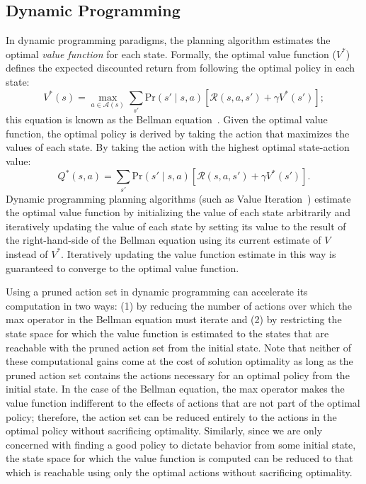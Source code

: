 \documentclass[]{article}
\newcommand{\stnote}[1]{\textcolor{Blue}{\textbf{ST: #1}}}
\newcommand{\dgnote}[1]{\textcolor{Orange}{\textbf{DG: #1}}}
\begin{document}
\subsection{Dynamic Programming}
In dynamic programming paradigms, the planning algorithm estimates the
optimal {\em value function} for each state. Formally, the optimal
value function ($V^*$) defines the expected discounted return from
following the optimal policy in each state:
\begin{equation}
\label{eq:bellman}
V^*(s) = \max_{a \in \mathcal{A}(s)} \sum_{s'} \text{Pr}(s' \mid s, a)\left[\mathcal{R}(s,a,s') + \gamma V^*(s') \right];
\end{equation}
this equation is known as the Bellman
equation~\citep{bellman57}. Given the optimal value function, the
optimal policy is derived by taking the action that maximizes the
values of each state. By taking the action with the
highest optimal state-action value:
\begin{equation}
\label{eq:qvalue}
Q^*(s,a) = \sum_{s'} \text{Pr}(s' \mid s, a)\left[\mathcal{R}(s,a,s') + \gamma V^*(s') \right].
\end{equation}
Dynamic programming planning algorithms (such as Value
Iteration~\citep{bellman57}) estimate the optimal value function by
initializing the value of each state arbitrarily and iteratively
updating the value of each state by setting its value to the result of
the right-hand-side of the Bellman equation using its current estimate
of $V$ instead of $V^*$. Iteratively updating the value function
estimate in this way is guaranteed to converge to the optimal value
function.

Using a pruned action set in dynamic programming can accelerate its
computation in two ways: (1) by reducing the number of actions over
which the max operator in the Bellman equation must iterate and (2) by
restricting the state space for which the value function is estimated
to the states that are reachable with the pruned action set from the
initial state. Note that neither of these computational gains come at
the cost of solution optimality as long as the pruned action set
contains the actions necessary for an optimal policy from the initial
state. In the case of the Bellman equation, the max operator makes the
value function indifferent to the effects of actions that are not part
of the optimal policy; therefore, the action set can be reduced
entirely to the actions in the optimal policy without sacrificing
optimality. Similarly, since we are only concerned with finding a good
policy to dictate behavior from some initial state, the state space
for which the value function is computed can be reduced to that which
is reachable using only the optimal actions without sacrificing
optimality.  
\end{document}
